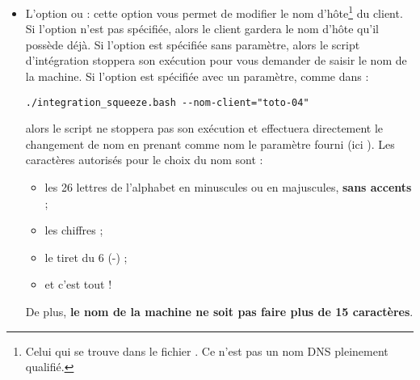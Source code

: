 \begin{itemize}
\item L'option  ou  :
cette option vous permet de modifier le nom
d'hôte\footnote{Celui qui se trouve dans le fichier .
Ce n'est pas un nom DNS pleinement qualifié.} du client. Si l'option n'est pas
spécifiée, alors le client gardera le nom d'hôte qu'il possède déjà.
Si l'option est spécifiée sans paramètre, alors le script d'intégration
stoppera son exécution pour vous demander de saisir le nom de la machine.
Si l'option est spécifiée avec un paramètre, comme dans :
%
\begin{lstlisting}
./integration_squeeze.bash --nom-client="toto-04"
\end{lstlisting}
%
alors le script ne stoppera pas son exécution et effectuera directement
le changement de nom en prenant comme nom le paramètre fourni (ici
). Les caractères autorisés pour le choix du nom
sont :
%
\begin{itemize}
\item les 26 lettres de l'alphabet en minuscules ou en majuscules, \textbf{sans accents} ;
\item les chiffres ;
\item le \og tiret du 6 \fg{} (-) ;
\item et c'est tout !
\end{itemize}
%
De plus, \textbf{le nom de la machine ne soit pas faire plus de 15 caractères}.


\end{itemize}
